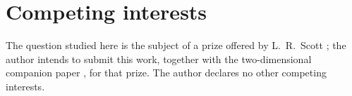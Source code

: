 \section*{Competing interests}
The question studied here is the subject of a prize offered by L.~R.~Scott \cite{ScottPrize}; the author intends to submit this work, together with the two-dimensional companion paper \cite{PadhiLong2D}, for that prize. The author declares no other competing interests.
